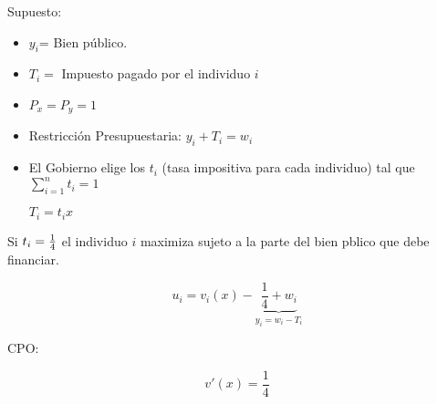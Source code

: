 Supuesto:

\begin{itemize}
	\item $y_i$= Bien público.
	\item $T_i=$ Impuesto pagado por el individuo $i$
	\item $P_x=P_y=1$
	\item Restricción Presupuestaria: $y_i+T_i=w_i$
	\item El Gobierno elige los $t_i$ (tasa impositiva para cada individuo) tal que $\sum_{i=1}^{n}t_i=1$
	
	$T_i=t_ix$
\end{itemize}

Si $t_i= {1 \over 4}$ el individuo $i$ maximiza sujeto a la parte del bien pblico que debe financiar.

$$ u_i=v_i(x)- \underbrace{\frac{1}{4}+w_i}_{y_i=w_i-T_i}$$

CPO:

$$v'(x)=\frac{1}{4}$$


